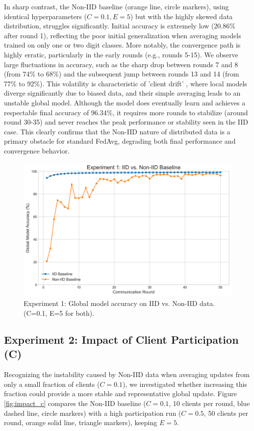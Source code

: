 \documentclass[conference]{IEEEtran}
\begin{document}
In sharp contrast, the Non-IID baseline (orange line, circle markers), using identical hyperparameters ($C=0.1, E=5$) but with the highly skewed data distribution, struggles significantly. Initial accuracy is extremely low (20.86\% after round 1), reflecting the poor initial generalization when averaging models trained on only one or two digit classes. More notably, the convergence path is highly erratic, particularly in the early rounds (e.g., rounds 5-15). We observe large fluctuations in accuracy, such as the sharp drop between rounds 7 and 8 (from 74\% to 68\%) and the subsequent jump between rounds 13 and 14 (from 77\% to 92\%). This volatility is characteristic of 'client drift' \cite{b8}, where local models diverge significantly due to biased data, and their simple averaging leads to an unstable global model. Although the model does eventually learn and achieves a respectable final accuracy of 96.34\%, it requires more rounds to stabilize (around round 30-35) and never reaches the peak performance or stability seen in the IID case. This clearly confirms that the Non-IID nature of distributed data is a primary obstacle for standard FedAvg, degrading both final performance and convergence behavior.

\begin{figure}[htbp]
  \centering
  \includegraphics[width=0.9\linewidth]{fig_1_iid_vs_non_iid} %
  \caption{Experiment 1: Global model accuracy on IID vs. Non-IID data. (C=0.1, E=5 for both).}
  \label{fig:iid}
\end{figure}

\subsection{Experiment 2: Impact of Client Participation (C)}
Recognizing the instability caused by Non-IID data when averaging updates from only a small fraction of clients ($C=0.1$), we investigated whether increasing this fraction could provide a more stable and representative global update. Figure \ref{fig:impact_c} compares the Non-IID baseline ($C=0.1$, 10 clients per round, blue dashed line, circle markers) with a high participation run ($C=0.5$, 50 clients per round, orange solid line, triangle markers), keeping $E=5$.
\end{document}
